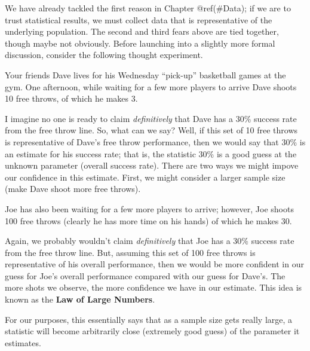 \documentclass[]{book}
\theoremstyle{definition}
\theoremstyle{definition}
\theoremstyle{definition}
\theoremstyle{remark}
\let\BeginKnitrBlock\begin \let\EndKnitrBlock\end
\begin{document}
We have already tackled the first reason in Chapter @ref(\#Data); if we
are to trust statistical results, we must collect data that is
representative of the underlying population. The second and third fears
above are tied together, though maybe not obviously. Before launching
into a slightly more formal discussion, consider the following thought
experiment.

\BeginKnitrBlock{example}[Free Throws]
\protect\hypertarget{exm:samplingdistns-free-throws}{}{\label{exm:samplingdistns-free-throws}
{} }Your friends Dave lives for his Wednesday
``pick-up'' basketball games at the gym. One afternoon, while waiting
for a few more players to arrive Dave shoots 10 free throws, of which he
makes 3.
\EndKnitrBlock{example}

I imagine no one is ready to claim \emph{definitively} that Dave has a
30\% success rate from the free throw line. So, what can we say? Well,
if this set of 10 free throws is representative of Dave's free throw
performance, then we would say that 30\% is an estimate for his success
rate; that is, the statistic 30\% is a good guess at the unknown
parameter (overall success rate). There are two ways we might impove our
confidence in this estimate. First, we might consider a larger sample
size (make Dave shoot more free throws).

\BeginKnitrBlock{example}[Free Throws (cont.)]
\protect\hypertarget{exm:samplingdistns-free-throws2}{}{\label{exm:samplingdistns-free-throws2}
{} }Joe has also been waiting for a
few more players to arrive; however, Joe shoots 100 free throws (clearly
he has more time on his hands) of which he makes 30.
\EndKnitrBlock{example}

Again, we probably wouldn't claim \emph{definitively} that Joe has a
30\% success rate from the free throw line. But, assuming this set of
100 free throws is representative of his overall performance, then we
would be more confident in our guess for Joe's overall performance
compared with our guess for Dave's. The more shots we observe, the more
confidence we have in our estimate. This idea is known as the
\textbf{Law of Large Numbers}.

\BeginKnitrBlock{definition}[Law of Large Numbers]
\protect\hypertarget{def:defn-lln}{}{\label{def:defn-lln} {} }For our purposes, this essentially says that as a
sample size gets really large, a statistic will become arbitrarily close
(extremely good guess) of the parameter it estimates.
\EndKnitrBlock{definition}
\end{document}
